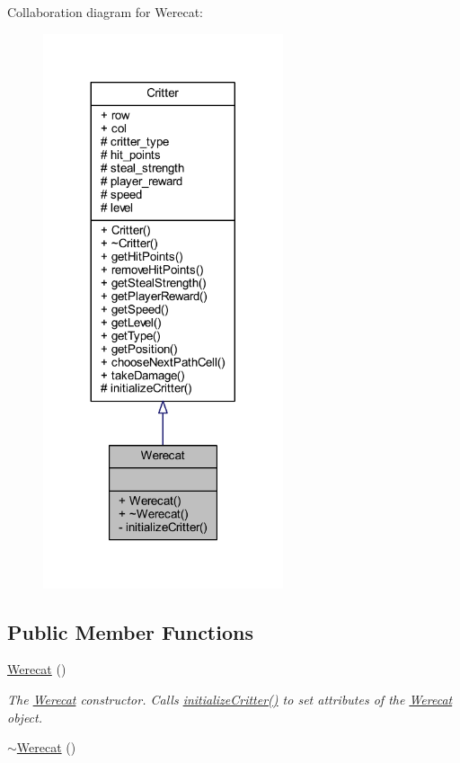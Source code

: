 Collaboration diagram for Werecat\+:
\nopagebreak
\begin{figure}[H]
\begin{center}
\leavevmode
\includegraphics[width=200pt]{class_werecat__coll__graph}
\end{center}
\end{figure}
\subsection*{Public Member Functions}
\begin{DoxyCompactItemize}
\item 
\hyperlink{class_werecat_ab6533d29e63885a9599ed7c8605f998e}{Werecat} ()
\begin{DoxyCompactList}\small\item\em The \hyperlink{class_werecat}{Werecat} constructor. Calls \hyperlink{class_werecat_ae3c16d3ee0d96cb7ad7126cc3ae088a0}{initialize\+Critter()} to set attributes of the \hyperlink{class_werecat}{Werecat} object. \end{DoxyCompactList}\item 
\hyperlink{class_werecat_aa83431ddead97d0e43618c0fe6ac2551}{$\sim$\+Werecat} ()
\end{DoxyCompactItemize}
